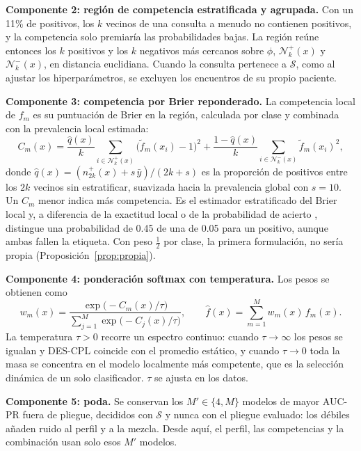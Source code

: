 \documentclass[pdflatex,sn-mathphys-num]{sn-jnl}
\theoremstyle{plain}
\begin{document}
\textbf{Componente 2: región de competencia estratificada y agrupada.} Con un 11\% de positivos, los $k$ vecinos de una consulta a menudo no contienen positivos, y la competencia solo premiaría las probabilidades bajas. La región reúne entonces los $k$ positivos y los $k$ negativos más cercanos sobre $\phi$, $\mathcal{N}^{+}_{k}(x)$ y $\mathcal{N}^{-}_{k}(x)$, en distancia euclidiana. Cuando la consulta pertenece a $\mathcal{S}$, como al ajustar los hiperparámetros, se excluyen los encuentros de su propio paciente.

\textbf{Componente 3: competencia por Brier reponderado.} La competencia local de $f_m$ es su puntuación de Brier en la región, calculada por clase y combinada con la prevalencia local estimada:
\begin{equation}
C_m(x) = \frac{\hat{q}(x)}{k}\sum_{i\in\mathcal{N}^{+}_{k}(x)} \big(\tilde{f}_m(x_i) - 1\big)^2 + \frac{1-\hat{q}(x)}{k}\sum_{i\in\mathcal{N}^{-}_{k}(x)} \tilde{f}_m(x_i)^2 ,
\label{eq:competencia}
\end{equation}
donde $\hat{q}(x)=(n^{+}_{2k}(x)+s\,\bar{y})/(2k+s)$ es la proporción de positivos entre los $2k$ vecinos sin estratificar, suavizada hacia la prevalencia global con $s=10$. Un $C_m$ menor indica más competencia. Es el estimador estratificado del Brier local y, a diferencia de la exactitud local \cite{bib_ko_2008} o de la probabilidad de acierto \cite{bib_woloszynski_2011}, distingue una probabilidad de 0.45 de una de 0.05 para un positivo, aunque ambas fallen la etiqueta. Con peso $\tfrac{1}{2}$ por clase, la primera formulación, no sería propia (Proposición~\ref{prop:propia}).

\textbf{Componente 4: ponderación softmax con temperatura.} Los pesos se obtienen como
\begin{equation}
w_m(x) = \frac{\exp\!\big(-C_m(x)/\tau\big)}{\sum_{j=1}^{M}\exp\!\big(-C_j(x)/\tau\big)}, \qquad
\hat{f}(x) = \sum_{m=1}^{M} w_m(x)\, f_m(x).
\label{eq:pesos}
\end{equation}
La temperatura $\tau>0$ recorre un espectro continuo: cuando $\tau\to\infty$ los pesos se igualan y DES-CPL coincide con el promedio estático, y cuando $\tau\to 0$ toda la masa se concentra en el modelo localmente más competente, que es la selección dinámica de un solo clasificador. $\tau$ se ajusta en los datos.

\textbf{Componente 5: poda.} Se conservan los $M'\in\{4, M\}$ modelos de mayor AUC-PR fuera de pliegue, decididos con $\mathcal{S}$ y nunca con el pliegue evaluado: los débiles añaden ruido al perfil y a la mezcla. Desde aquí, el perfil, las competencias y la combinación usan solo esos $M'$ modelos.
\end{document}
